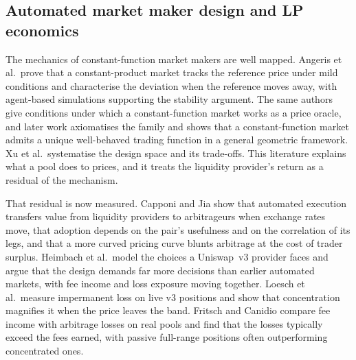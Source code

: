 \subsection{Automated market maker design and LP economics}

The mechanics of constant-function market makers are well mapped. Angeris et
al.\ prove that a constant-product market tracks the reference price under mild
conditions and characterise the deviation when the reference moves away, with
agent-based simulations supporting the stability argument\cite{angeris2019analysis}.
The same authors give conditions under which a constant-function market works
as a price oracle\cite{angeris2020improved}, and later work axiomatises the
family and shows that a constant-function market admits a unique well-behaved
trading function in a general geometric
framework\cite{schlegel2022axioms,angeris2023geometry}. Xu et al.\ systematise
the design space and its trade-offs\cite{xu2021sok}. This literature explains
what a pool does to prices, and it treats the liquidity provider's return as a
residual of the mechanism.

That residual is now measured. Capponi and Jia show that automated execution
transfers value from liquidity providers to arbitrageurs when exchange rates
move, that adoption depends on the pair's usefulness and on the correlation of
its legs, and that a more curved pricing curve blunts arbitrage at the cost of
trader surplus\cite{capponi2021adoption}. Heimbach et al.\ model the choices a
Uniswap~v3 provider faces and argue that the design demands far more decisions
than earlier automated markets, with fee income and loss exposure moving
together\cite{heimbach2022risks}. Loesch et al.\ measure impermanent loss on
live v3 positions and show that concentration magnifies it when the price
leaves the band\cite{loesch2021impermanent}. Fritsch and Canidio compare fee
income with arbitrage losses on real pools and find that the losses typically
exceed the fees earned, with passive full-range positions often outperforming
concentrated ones\cite{fritsch2024measuring}.

